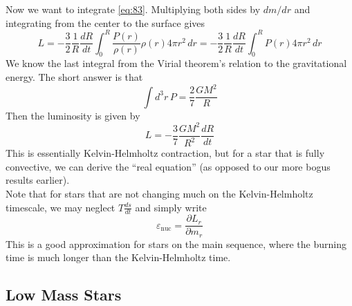 \documentclass[10pt]{article}
\numberwithin{equation}{section}
\newcommand{\n}{\noindent}
\begin{document}
  \n Now we want to integrate \eqref{eq:83}. Multiplying both sides
  by $dm/dr$ and integrating from the center to the surface gives
  \begin{equation}
    \label{eq:85}
    L=-\frac{3}{2}\frac{1}{R}\frac{dR}{dt}\int_0^R\frac{P(r)}{\rho(r)}\rho(r)4\pi
    r^2\,dr=-\frac{3}{2}\frac{1}{R}\frac{dR}{dt}\int_0^RP(r)4\pi r^2\,dr
  \end{equation}
  We know the last integral from the Virial theorem's relation to the
  gravitational energy. The short answer is that
  \begin{equation}
    \label{eq:86}
    \int d^3r\,P=\frac{2}{7}\frac{GM^2}{R}
  \end{equation}
  Then the luminosity is given by
  \begin{equation}
    \label{eq:87}
    L=-\frac{3}{7}\frac{GM^2}{R^2}\frac{dR}{dt}
  \end{equation}
  This is essentially Kelvin-Helmholtz contraction, but for a star
  that is fully convective, we can derive the ``real equation'' (as
  opposed to our more bogus results earlier).\\

  \n Note that for stars that are not changing much on the
  Kelvin-Helmholtz timescale, we may neglect $T\frac{ds}{dt}$ and
  simply write
  \begin{equation}
    \label{eq:147}
    \varepsilon_{\mathrm{nuc}}=\frac{\partial L_r}{\partial m_r}
  \end{equation}
  This is a good approximation for stars on the main sequence, where
  the burning time is much longer than the Kelvin-Helmholtz time.

  \subsection{Low Mass Stars}
  \label{sec:low-mass-stars}
\end{document}

